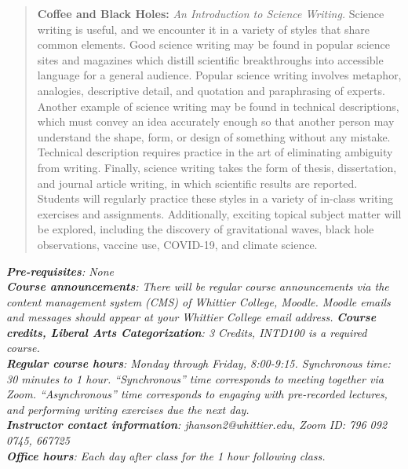 \documentclass[10pt]{article}
\begin{document}
\maketitle

\begin{abstract}
\textbf{Coffee and Black Holes:} \textit{An Introduction to Science Writing.}  Science writing is useful, and we encounter it in a variety of styles that share common elements. Good science writing may be found in popular science sites and magazines which distill scientific breakthroughs into accessible language for a general audience. Popular science writing involves metaphor, analogies, descriptive detail, and quotation and paraphrasing of experts. Another example of science writing may be found in technical descriptions, which must convey an idea accurately enough so that another person may understand the shape, form, or design of something without any mistake. Technical description requires practice in the art of eliminating ambiguity from writing. Finally, science writing takes the form of thesis, dissertation, and journal article writing, in which scientific results are reported. Students will regularly practice these styles in a variety of in-class writing exercises and assignments.  Additionally, exciting topical subject matter will be explored, including the discovery of gravitational waves, black hole observations, vaccine use, COVID-19, and climate science.
\end{abstract}
\noindent
\textit{\textbf{Pre-requisites}: None} \\
\textit{\textbf{Course announcements}: There will be regular course announcements via the content management system (CMS) of Whittier College, Moodle.  Moodle emails and messages should appear at your Whittier College email address.}
\textit{\textbf{Course credits, Liberal Arts Categorization}: 3 Credits, INTD100 is a required course.} \\
\textit{\textbf{Regular course hours}: Monday through Friday, 8:00-9:15.  Synchronous time: 30 minutes to 1 hour.  ``Synchronous'' time corresponds to meeting together via Zoom. ``Asynchronous'' time corresponds to engaging with pre-recorded lectures, and performing writing exercises due the next day.} \\
\textit{\textbf{Instructor contact information}: jhanson2@whittier.edu, Zoom ID: 796 092 0745, 667725} \\
\textit{\textbf{Office hours}: Each day after class for the 1 hour following class.} \\
\end{document}
